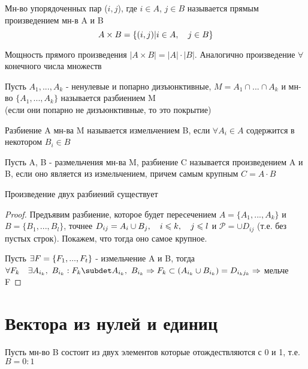 \documentclass[12pt, fleqn]{article}
\begin{document}
\begin{definition}
  Мн-во упорядоченных пар ($i,j$), где $i \in A$, $j \in B$ называется прямым произведением мн-в A и B
  \[A \times B = \{(i,j)| i \in A,\quad j \in B\}\]
\end{definition}

\begin{remark}
  Мощность прямого произведения $|A \times B| = |A| \cdot |B|$. Аналогично произведение $\forall$ конечного числа множеств
\end{remark}

\begin{definition}
  Пусть $A_1,...,A_k$ - ненулевые и попарно дизъюнктивные, $M = A_1 \cap ... \cap A_k$ и мн-во $\{A_1,...,A_k\}$ называется разбиением M\\
  (если они попарно не дизъюнктивные, то это покрытие)
\end{definition}

\begin{definition}
  Разбиение A мн-ва M называется измельчением B, если $\forall A_i \in A$ содержится в некотором $B_i \in B$
\end{definition}


\begin{definition}
  Пусть A, B - размельчения мн-ва M, разбиение C называется произведением A и B, если оно является из измельчением, причем самым крупным $C = A \cdot B$
\end{definition}

\begin{theorem}
  Произведение двух разбиений существует
\end{theorem}

\begin{proof}
  Предъявим разбиение, которое будет пересечением $A = \{A_1,...,A_k\}$ и $B = \{B_1,...,B_l\}$, точнее $D_{ij} = A_i \cup B_j,\quad i \leqslant k,\quad j \leqslant l$ и $\mathcal{P} = \cup D_{ij}$ (т.е. без пустых строк). Покажем, что тогда оно самое крупное.

  Пусть $\exists F = \{F_1,...,F_t\}$ - измельчение A и B, тогда $\forall F_k\q \e A_{i_k},\ B_{i_k}: F_k \subdet A_{i_k},\ B_{i_k} \Ra F_k \subset (A_{i_k} \cup B_{i_k}) = D_{i_k j_k} \Ra$ мельче F
\end{proof}


\section{Вектора из нулей и единиц}
Пусть мн-во B состоит из двух элементов которые отождествляются с 0 и 1, т.е. $B = 0:1$
\end{document}
